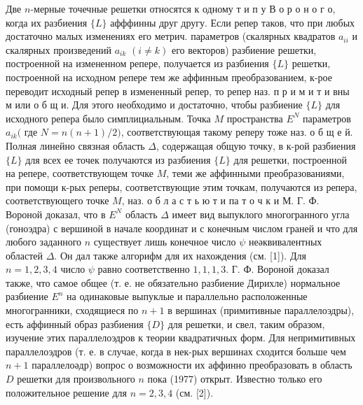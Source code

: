 \documentclass[10pt]{article}
\begin{document}
Две $n$-мерные точечные решетки относятся к одному т и п у В о р о н о г о, когда их разбиения $\{L\}$ афффинны друг другу. Если репер таков, что при любых достаточно малых изменениях его метрич. параметров (скалярных квадратов $a_{i i}$ и скалярных произведений $a_{i k}$ $(i \neq k)$ его векторов) разбиение решетки, построенной на измененном репере, получается из разбиения $\{L\}$ решетки, построенной на исходном репере тем же аффинным преобразованием, к-рое переводит исходный репер в измененный репер, то репер наз. п р и м и т и вны м или о б щ и. Для этого необходимо и достаточно, чтобы разбиение $\{L\}$ для исходного репера было симплициальным. Точка $M$ пространства $E^{N}$ параметров $a_{i k}($ где $N=n(n+1) / 2)$, соответствующая такому реперу тоже наз. о б щ е й. Полная линейно связная область $\Delta$, содержащая общую точку, в к-рой разбиения $\{L\}$ для всех ее точек получаются из разбиения $\{L\}$ для решетки, построенной на репере, соответствующем точке $M$, теми же аффинными преобразованиями, при помощи к-рых реперы, соответствующие этим точкам, получаются из репера, соответствующего точке $M$, наз. о б л а с т ь ю т и па т о ч к и $М$. Г. Ф. Вороной доказал, что в $E^{N}$ область $\Delta$ имеет вид выпуклого многогранного угла (гоноэдра) с вершиной в начале координат и с конечным числом граней и что для любого заданного $n$ существует лишь конечное число $\psi$ неәквивалентных областей $\Delta$. Он дал также алгорифм для их нахождения (см. [1]). Для $n=1,2,3,4$ число $\psi$ равно соответственно $1,1,1,3$. Г. Ф. Вороной доказал также, что самое общее (т. е. не обязательно разбиение Дирихле) нормальное разбиение $E^{n}$ на одинаковые выпуклые и параллельно расположенные многогранники, сходящиеся по $n+1$ в вершинах (примитивные параллелоэдры), есть аффинный образ разбиения $\{D\}$ для решетки, и свел, таким образом, изучение этих параллелоэдров к теории квадратичных форм. Для непримитивных параллелоэдров (т. е. в случае, когда в нек-рых вершинах сходится больше чем $n+1$ параллелоәдр) вопрос о возможности их аффинно преобразовать в область $D$ решетки для произвольного $n$ пока (1977) открыт. Известно только его положительное решение для $n=2,3,4$ (см. [2]).
\end{document}
